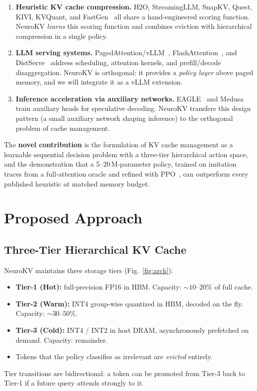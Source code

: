 \documentclass[journal]{IEEEtran}
\begin{document}
\begin{enumerate}
    \item \textbf{Heuristic KV cache compression.} H2O, StreamingLLM, SnapKV, Quest, KIVI, KVQuant, and FastGen~\cite{zhang2023h2o,xiao2024streamingllm,li2024snapkv,tang2024quest,liu2024kivi,hooper2024kvquant,ge2024fastgen} all share a hand-engineered scoring function. NeuroKV \emph{learns} this scoring function and combines eviction with hierarchical compression in a single policy.
    \item \textbf{LLM serving systems.} PagedAttention/vLLM~\cite{kwon2023vllm}, FlashAttention~\cite{dao2022flashattention,dao2023flashattention2,dao2024flashattention3}, and DistServe~\cite{zhong2024distserve} address scheduling, attention kernels, and prefill/decode disaggregation. NeuroKV is orthogonal: it provides a \emph{policy layer} above paged memory, and we will integrate it as a vLLM extension.
    \item \textbf{Inference acceleration via auxiliary networks.} EAGLE~\cite{li2024eagle} and Medusa~\cite{cai2024medusa} train auxiliary heads for speculative decoding. NeuroKV transfers this design pattern (a small auxiliary network shaping inference) to the orthogonal problem of cache management.
\end{enumerate}
The \textbf{novel contribution} is the formulation of KV cache management as a learnable sequential decision problem with a three-tier hierarchical action space, and the demonstration that a 5--20\,M-parameter policy, trained on imitation traces from a full-attention oracle and refined with PPO~\cite{schulman2017ppo}, can outperform every published heuristic at matched memory budget.

\section{Proposed Approach}
\label{sec:approach}

\subsection{Three-Tier Hierarchical KV Cache}
NeuroKV maintains three storage tiers (Fig.~\ref{fig:arch}):
\begin{itemize}
    \item \textbf{Tier-1 (Hot):} full-precision FP16 in HBM. Capacity: $\sim 10$--$20\%$ of full cache.
    \item \textbf{Tier-2 (Warm):} INT4 group-wise quantized in HBM, decoded on the fly. Capacity: $\sim 30$--$50\%$.
    \item \textbf{Tier-3 (Cold):} INT4 / INT2 in host DRAM, asynchronously prefetched on demand. Capacity: remainder.
    \item Tokens that the policy classifies as irrelevant are \emph{evicted} entirely.
\end{itemize}
Tier transitions are bidirectional: a token can be promoted from Tier-3 back to Tier-1 if a future query attends strongly to it.
\end{document}
